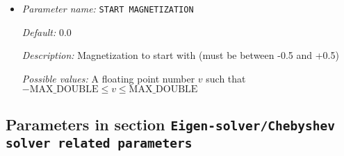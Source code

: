 \begin{itemize}
{\it Default:} 0


{\it Description:} Spin polarization: 0 for no spin polarization and 1 for spin polarization


{\it Possible values:} An integer $n$ such that $0\leq n \leq 1$
\item {\it Parameter name:} {\tt START MAGNETIZATION}
\label{parameters:DFT functional related parameters/START MAGNETIZATION}
\label{parameters:DFT_20functional_20related_20parameters/START_20MAGNETIZATION}


{\it Default:} 0.0


{\it Description:} Magnetization to start with (must be between -0.5 and +0.5)


{\it Possible values:} A floating point number $v$ such that $-\text{MAX\_DOUBLE} \leq v \leq \text{MAX\_DOUBLE}$
\end{itemize}

\subsection{Parameters in section \tt Eigen-solver/Chebyshev solver related parameters}
\label{parameters:Eigen_2dsolver_2fChebyshev_20solver_20related_20parameters}

